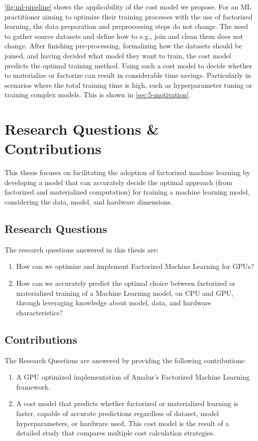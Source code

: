 \autoref{fig:ml-pipeline} shows the applicability of the cost model we propose. For an ML practitioner aiming to optimize their training processes with the use of factorized learning, the data preparation and preprocessing steps do not change. The need to gather source datasets and define how to e.g., join and clean them does not change. After finishing pre-processing, formalizing how the datasets should be joined, and having decided what model they want to train, the cost model predicts the optimal training method. Using such a cost model to decide whether to materialize or factorize can result in considerable time savings. Particularly in scenarios where the total training time is high,  such as hyperparameter tuning or training complex models. This is shown in \autoref{sec:5-motivation}.

\section{Research Questions \& Contributions}
This thesis focuses on facilitating the adoption of factorized machine learning by developing a model that can accurately decide the optimal approach (from factorized and materialized computation) for training a machine learning model, considering the data, model, and hardware dimensions.

\subsection{Research Questions}
The research questions answered in this thesis are:
\begin{enumerate}[leftmargin=1.5cm, label=\emph{RQ.\arabic*}]
    \item How can we optimize and implement Factorized Machine Learning for GPUs?
    \item How can we accurately predict the optimal choice between factorized or materialized training of a Machine Learning model, on CPU and GPU, through leveraging knowledge about model, data, and hardware characteristics?
\end{enumerate}

\subsection{Contributions}
The Research Questions are answered by providing the following contributions:
\begin{enumerate}[leftmargin=1.5cm, label=\emph{C.\arabic*}]
    \item A GPU optimized implementation of Amalur's Factorized Machine Learning framework.
    \item A cost model that predicts whether factorized or materialized learning is faster, capable of accurate predictions regardless of dataset, model hyperparameters, or hardware used. This cost model is the result of a detailed study that compares multiple cost calculation strategies.
\end{enumerate}

